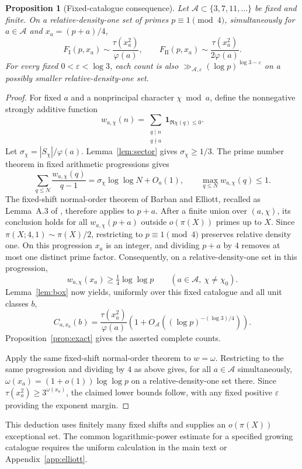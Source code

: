 \documentclass[11pt]{article}
\newtheorem{proposition}[theorem]{Proposition}
\theoremstyle{remark}\newtheorem{remark}[theorem]{Remark}
\newcommand{\one}{\mathbf 1}
\newcommand{\eps}{\varepsilon}
\newcommand{\FI}{F_{\mathrm I}}
\newcommand{\FII}{F_{\mathrm {II}}}
\begin{document}
\begin{proposition}[Fixed-catalogue consequence]\label{prop:fixed-known}
Let $\mathcal A\subset\{3,7,11,\ldots\}$ be fixed and finite. On a relative-density-one set of primes
$p\equiv1\pmod4$, simultaneously for $a\in\mathcal A$ and
$x_a=(p+a)/4$,
\[
 \FI(p,x_a)\sim\frac{\tau(x_a^2)}{\varphi(a)},\qquad
 \FII(p,x_a)\sim\frac{\tau(x_a^2)}{2\varphi(a)}.
\]
For every fixed $0<\eps<\log3$, each count is also
$\gg_{\mathcal A,\eps}(\log p)^{\log3-\eps}$ on a possibly
smaller relative-density-one set.
\end{proposition}
\begin{proof}
For fixed $a$ and a nonprincipal character $\chi\bmod a$, define
the nonnegative strongly additive function
\[
 w_{a,\chi}(n)=\sum_{\substack{q\mid n\\q\nmid a}}
                      \one_{\Re\chi(q)\le0}.
\]
Let $\sigma_\chi=|S_\chi|/\varphi(a)$. Lemma~\ref{lem:sector}
gives $\sigma_\chi\ge1/3$. The prime number theorem in fixed
arithmetic progressions gives
\[
 \sum_{q\le N}\frac{w_{a,\chi}(q)}{q-1}
       =\sigma_\chi\log\log N+O_a(1),\qquad
 \max_{q\le N}w_{a,\chi}(q)\le1.
\]
The fixed-shift normal-order theorem of Barban and Elliott, recalled
as Lemma~A.3 of \cite{ET}, therefore applies to $p+a$.
After a finite union over $(a,\chi)$, its conclusion holds for all
$w_{a,\chi}(p+a)$ outside $o(\pi(X))$ primes up to $X$.
Since $\pi(X;4,1)\sim\pi(X)/2$, restricting to $p\equiv1\pmod4$
preserves relative density one. On this progression $x_a$ is an
integer, and dividing $p+a$ by $4$ removes at most one distinct prime
factor. Consequently, on a relative-density-one set in this progression,
\[
 w_{a,\chi}(x_a)\ge\tfrac14\log\log p
 \qquad(a\in\mathcal A,\ \chi\ne\chi_0).
\]
Lemma~\ref{lem:box} now yields, uniformly over
this fixed catalogue and all unit classes $b$,
\[
 C_{a,x_a}(b)=\frac{\tau(x_a^2)}{\varphi(a)}
 \left(1+O_{\mathcal A}((\log p)^{-(\log3)/4})\right).
\]
Proposition~\ref{prop:exact} gives the asserted complete counts.

Apply the same fixed-shift normal-order theorem to $w=\omega$.
Restricting to the same progression and dividing by $4$ as above gives,
for all $a\in\mathcal A$ simultaneously,
$\omega(x_a)=(1+o(1))\log\log p$ on a relative-density-one set there.
Since $\tau(x_a^2)\ge3^{\omega(x_a)}$, the claimed lower bounds
follow, with any fixed positive $\eps$ providing the exponent margin.
\end{proof}

This deduction uses finitely many fixed shifts and supplies an
$o(\pi(X))$ exceptional set. The common logarithmic-power estimate
for a specified growing catalogue requires the uniform calculation
in the main text or Appendix~\ref{app:elliott}.
\end{document}
